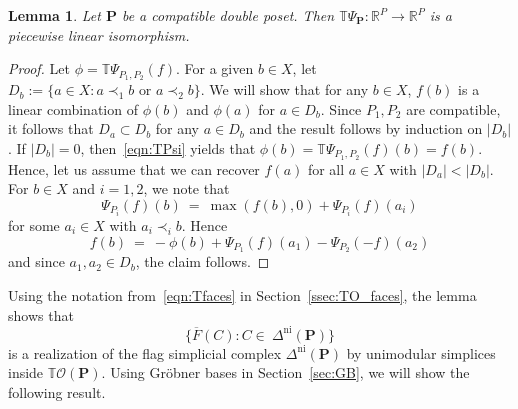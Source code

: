 \documentclass[11pt]{amsart}
\newtheorem{lem}[thm]{Lemma}
\theoremstyle{definition}
\begin{document}
\begin{lem}\label{lem:TPsi_iso}
    Let ${\mathbf{P}}$ be a compatible double poset. Then ${{\mathbb{T}}{\Psi}_{\mathbf{P}}} : {\mathbb{R}}^{P}
    \rightarrow {\mathbb{R}}^{P}$ is a piecewise linear isomorphism. 
\end{lem}    
\begin{proof}
    Let $\phi = {{\mathbb{T}}{\Psi}_{{{P}_1,{P}_2}}}(f)$.  For a given $b \in X$, let $D_b := \{ a
    \in X : a \prec_1 b \text{ or } a \prec_2 b \}$.  We will show that for
    any $b \in X$, $f(b)$ is a linear combination of $\phi(b)$ and $\phi(a)$
    for $a \in D_b$.  Since ${P}_1,{P}_2$ are compatible, it follows that $D_a
    \subset D_b$ for any $a \in D_b$ and the result follows by induction on
    $|D_b|$. If $|D_b| = 0$, then~\eqref{eqn:TPsi} yields that $\phi(b) =
    {{\mathbb{T}}{\Psi}_{{{P}_1,{P}_2}}}(f)(b) = f(b)$. Hence, let us assume that we can recover
    $f(a)$ for all $a \in X$ with $|D_a| < |D_b|$. For $b \in X$ and $i=1,2$,
    we note that
    \[
       {\Psi}_{{P}_i}(f)(b) \ = \ \max(f(b),0) + {\Psi}_{{P}_i}(f)(a_i)
    \]
    for some $a_i \in X$ with $a_i \prec_i b$. Hence 
    \begin{equation}\label{eqn:TPsi_inv}
        f(b) \ = \ -\phi(b) + {\Psi}_{{P}_1}(f)(a_1) - {\Psi}_{{P}_2}(-f)(a_2)
    \end{equation}
    and since $a_1,a_2 \in D_b$, the claim follows.
\end{proof}

Using the notation from~\eqref{eqn:Tfaces} in Section~\ref{ssec:TO_faces}, the
lemma shows that 
\begin{equation}\label{eqn:TOrd_triang}
    \{ {\overline{F}({C})} : C \in \ {\Delta^\mathrm{ni}({\mathbf{P}})} \}
\end{equation}
is a realization of the flag simplicial complex ${\Delta^\mathrm{ni}({\mathbf{P}})}$ by
unimodular simplices inside ${{\mathbb{T}}{\mathcal{O}({\mathbf{P}})}}$. Using Gr\"obner bases in
Section~\ref{sec:GB}, we will show the following result.
\end{document}
